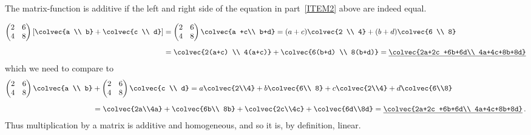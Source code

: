 \begin{example}
The matrix-function is additive if the left and right side of the equation  in part~\ref{ITEM2} above are indeed equal. 

\begin{equation*}
\begin{split}
     \begin{pmatrix}
      2             &6 \\
      4            &8
    \end{pmatrix}
   \left[ \colvec{a \\ b} +\colvec{c \\ d} \right] 
   &= 
        \begin{pmatrix}
      2             &6 \\
      4            &8
    \end{pmatrix}
    \colvec{a +c\\ b+d}  
   =
        (a+c) \colvec{2 \\ 4} 
        +
         (b+d) \colvec{6 \\ 8}\\[2mm]&
         =
        \colvec{2(a+c) \\ 4(a+c)} 
        +
        \colvec{6(b+d) \\ 8(b+d)}
             =
       \underline{ \colvec{2a+2c +6b+6d\\ 4a+4c+8b+8d} }
       \end{split}\end{equation*}
 which we need to compare to  
\begin{equation*}
\begin{split}
  \begin{pmatrix}
      2             &6 \\
      4            &8
    \end{pmatrix}
\colvec{a \\ b}
 &  +
    \begin{pmatrix}
      2             &6 \\
      4            &8
    \end{pmatrix}
    \colvec{c \\ d}
=
a\colvec{2\\4} + b\colvec{6\\ 8} + c\colvec{2\\4} +d\colvec{6\\8}\\[2mm]&
=\colvec{2a\\4a} + \colvec{6b\\ 8b} + \colvec{2c\\4c} +\colvec{6d\\8d}
=\underline{\colvec{2a+2c +6b+6d\\ 4a+4c+8b+8d} }\, .
\end{split}\end{equation*}
Thus multiplication by a  matrix is additive and homogeneous, and so it is, by definition, linear. 
\end{example}

